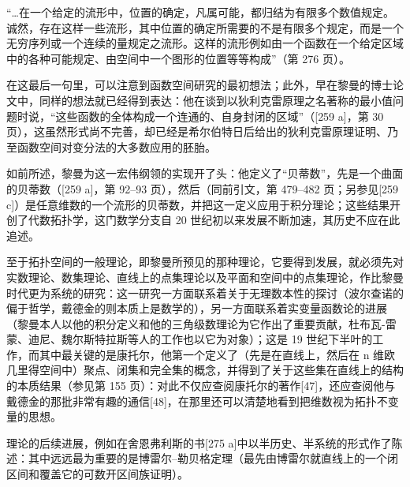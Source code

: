 “\ldots 在一个给定的流形中，位置的确定，凡属可能，都归结为有限多个数值规定。诚然，存在这样一些流形，其中位置的确定所需要的不是有限多个规定，而是一个无穷序列或一个连续的量规定之流形。这样的流形例如由一个函数在一个给定区域中的各种可能规定、由空间中一个图形的位置等等构成”（第 276 页）。

在这最后一句里，可以注意到函数空间研究的最初想法；此外，早在黎曼的博士论文中，同样的想法就已经得到表达：他在谈到以狄利克雷原理之名著称的最小值问题时说，“这些函数的全体构成一个连通的、自身封闭的区域”（{[}259 a{]}，第 30 页），这虽然形式尚不完善，却已经是希尔伯特日后给出的狄利克雷原理证明、乃至函数空间对变分法的大多数应用的胚胎。

如前所述，黎曼为这一宏伟纲领的实现开了头：他定义了“贝蒂数”，先是一个曲面的贝蒂数（{[}259 a{]}，第 92–93 页），然后（同前引文，第 479–482 页；另参见{[}259 c{]}）是任意维数的一个流形的贝蒂数，并把这一定义应用于积分理论；这些结果开创了代数拓扑学，这门数学分支自 20 世纪初以来发展不断加速，其历史不应在此追述。

至于拓扑空间的一般理论，即黎曼所预见的那种理论，它要得到发展，就必须先对实数理论、数集理论、直线上的点集理论以及平面和空间中的点集理论，作比黎曼时代更为系统的研究：这一研究一方面联系着关于无理数本性的探讨（波尔查诺的偏于哲学，戴德金的则本质上是数学的），另一方面联系着实变量函数论的进展（黎曼本人以他的积分定义和他的三角级数理论为它作出了重要贡献，杜布瓦-雷蒙、迪尼、魏尔斯特拉斯等人的工作也以它为对象）；这是 19 世纪下半叶的工作，而其中最关键的是康托尔，他第一个定义了（先是在直线上，然后在 n 维欧几里得空间中）聚点、闭集和完全集的概念，并得到了关于这些集在直线上的结构的本质结果（参见第 155 页）：对此不仅应查阅康托尔的著作{[}47{]}，还应查阅他与戴德金的那批非常有趣的通信{[}48{]}，在那里还可以清楚地看到把维数视为拓扑不变量的思想。

理论的后续进展，例如在舍恩弗利斯的书{[}275 a{]}中以半历史、半系统的形式作了陈述：其中远远最为重要的是博雷尔–勒贝格定理（最先由博雷尔就直线上的一个闭区间和覆盖它的可数开区间族证明）。

